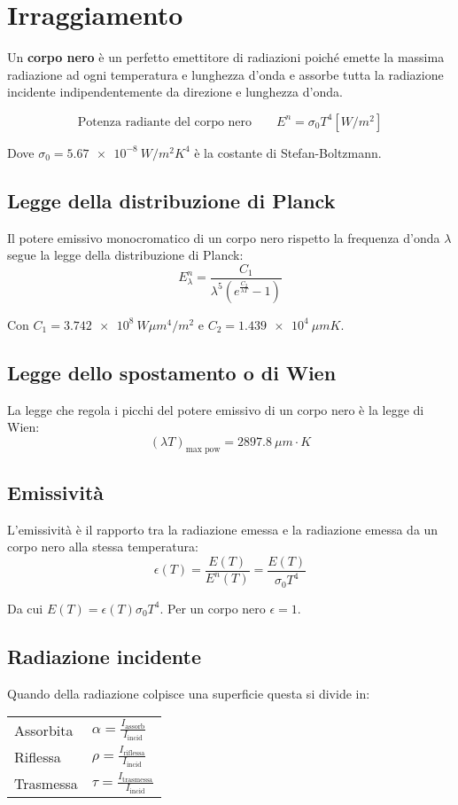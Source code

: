 \section{Irraggiamento}

Un \textbf{corpo nero} è un perfetto emettitore di radiazioni poiché emette la massima radiazione ad ogni temperatura e lunghezza d'onda e assorbe tutta la radiazione incidente indipendentemente da direzione e lunghezza d'onda.

\[
    \text{Potenza radiante del corpo nero} \qquad E^n = \sigma_0 T^4 [W/m^2]
\]

Dove $\sigma_0 = \SI{5.67e-8}{W/m^2K^4}$ è la costante di Stefan-Boltzmann.

\subsection{Legge della distribuzione di Planck}
Il potere emissivo monocromatico di un corpo nero rispetto la frequenza d'onda $\lambda$ segue la legge della distribuzione di Planck:
\[
    E^n_\lambda = \frac{C_1}{\lambda^5 (e^{\frac{C_2}{\lambda T}} - 1) }
\]

Con $C_1 = \SI{3.742e8}{W \mu m^4/m^2}$ e $C_2 = \SI{1.439e4}{\mu m K}$.

\subsection{Legge dello spostamento o di Wien}
La legge che regola i picchi del potere emissivo di un corpo nero è la legge di Wien:
\[
    (\lambda T)_{\text{max pow}} = \SI{2897.8}{\mu m\cdot K}
\]

\subsection{Emissività}
L'emissività è il rapporto tra la radiazione emessa e la radiazione emessa da un corpo nero alla stessa temperatura:
\[
    \epsilon(T) = \frac{E(T)}{E^n(T)} = \frac{E(T)}{\sigma_0T^4}
\]

Da cui $E(T) = \epsilon(T)\sigma_0T^4$. Per un corpo nero $\epsilon = 1$.

\subsection{Radiazione incidente}
Quando della radiazione colpisce una superficie questa si divide in:

\begin{tabular}{ll}
    Assorbita & $\alpha = \frac{I_\text{assorb}}{I_\text{incid}}$ \\
    Riflessa & $\rho = \frac{I_\text{riflessa}}{I_\text{incid}}$ \\
    Trasmessa & $\tau = \frac{I_\text{trasmessa}}{I_\text{incid}}$ \\
\end{tabular}

